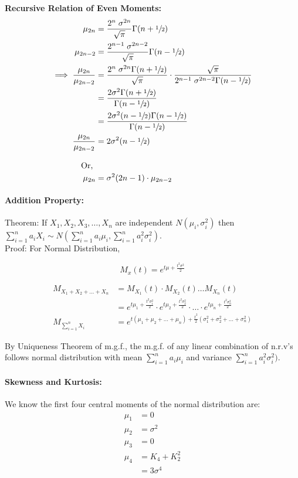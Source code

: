 \documentclass[
10pt, %
a4paper, %
]{report}
\begin{document}
\textbf{Recursive Relation of Even Moments:}
\begin{align*}
    \mu_{2n} &= \frac{2^n \; \sigma^{2n}}{\sqrt{\pi}} \Gamma (n + \sfrac{1}{2}) \\
    \mu_{2n-2} &= \frac{2^{n-1} \; \sigma^{2n-2}}{\sqrt{\pi}} \Gamma (n - \sfrac{1}{2}) \\
    \implies \frac{\mu_{2n}}{\mu_{2n-2}} &= \frac{2^n \; \sigma^{2n} \Gamma (n + \sfrac{1}{2})}{\sqrt{\pi}} \cdot \frac{\sqrt{\pi}} {2^{n-1} \; \sigma^{2n-2} \Gamma (n - \sfrac{1}{2})} \\
    &= \frac{2\sigma^2 \Gamma (n + \sfrac{1}{2})}{\Gamma (n - \sfrac{1}{2})} \\
    &= \frac{2\sigma^2 (n - \sfrac{1}{2} )\Gamma (n - \sfrac{1}{2})}{\Gamma (n - \sfrac{1}{2})} \\
    \frac{\mu_{2n}}{\mu_{2n-2}} &= 2\sigma^2 (n - \sfrac{1}{2}) \\ \\
    \text{Or, } \\
    \mu_{2n} &= \sigma^2 (2n - 1) \cdot \mu_{2n-2}
\end{align*}

\paragraph*{Addition Property:}
Theorem: If \(X_1, X_2, X_3, \dots, X_n\) are independent \(N(\mu_i, \sigma^2_i)\) then \(\sum_{i=1}^n a_i X_i \sim N(\sum_{i=1}^n a_i\mu_i, \sum_{i=1}^n a_i^2\sigma^2_i)\). \\
Proof:
For Normal Distribution,

\[
M_x(t) = e^{t\mu+\frac{t^2\sigma^2}{2}}
\]

\begin{align*}
    M_{X_1+X_2+\dots+X_n} &= M_{X_1}(t) \cdot M_{X_2}(t) \dots M_{X_n}(t) \\
                          &= e^{t\mu_1+\frac{t^2\sigma_1^2}{2}} \cdot e^{t\mu_2+\frac{t^2\sigma_2^2}{2}} \cdot \dots \cdot e^{t\mu_n+\frac{t^2\sigma_n^2}{2}} \\
    M_{\sum_{i=1}^n X_i} &= e^{t(\mu_1+\mu_2+\dots+\mu_n) + \frac{t^2}{2}(\sigma_1^2 + \sigma_2^2 +\dots+ \sigma_n^2)}
\end{align*}

By Uniqueness Theorem of m.g.f., the m.g.f. of any linear combination of n.r.v's follows normal distribution with mean \(\sum_{i=1}^n a_i\mu_i\) and variance \(\sum_{i=1}^n a_i^2\sigma_i^2)\).

\paragraph*{Skewness and Kurtosis:}
We know the first four central moments of the normal distribution are:
\begin{align*}
    \mu_1 &= 0 \\
    \mu_2 &= \sigma^2 \\
    \mu_3 &= 0 \\
    \mu_4 &= K_4 + K_2^2 \\
          &= 3\sigma^4
\end{align*}
\end{document}
